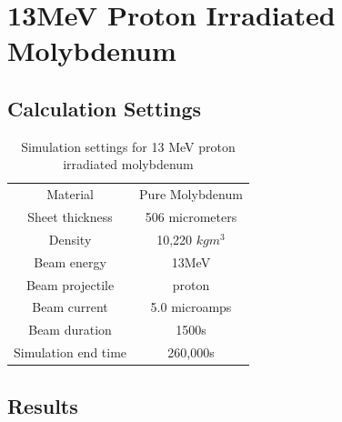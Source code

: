 \FloatBarrier
\clearpage
\section{13MeV Proton Irradiated Molybdenum}
\label{appendix:johnmo}

\FloatBarrier
\subsection{Calculation Settings}

\begin{table}[h]
\begin{center}
\begin{tabular}{c c}
\hline\hline
Material & Pure Molybdenum \\
Sheet thickness & 506 micrometers \\
Density & 10,220 $kg m^{3}$ \\
Beam energy & 13MeV \\
Beam projectile & proton \\
Beam current & 5.0 microamps \\
Beam duration & 1500s \\
Simulation end time & 260,000s \\
\hline\hline
\end{tabular}
\end{center}
\caption{Simulation settings for 13 MeV proton irradiated molybdenum}
\label{table:appendixironsettings}
\end{table}

\FloatBarrier
\subsection{Results}

